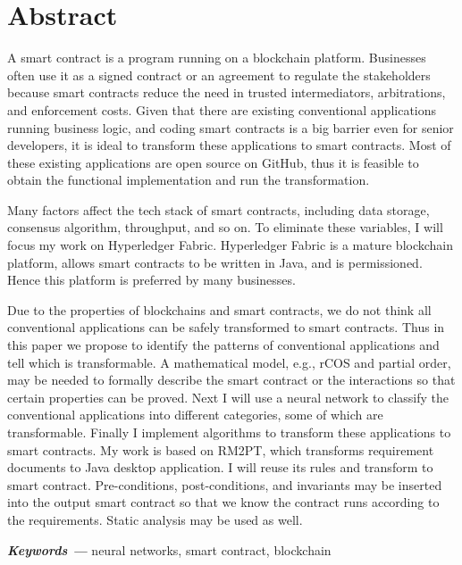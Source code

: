 \chapter{Abstract}

A smart contract is a program running on a blockchain platform.
Businesses often use it as a signed contract or an agreement to regulate the stakeholders
because smart contracts reduce the need in trusted intermediators, arbitrations, and enforcement costs.
Given that there are existing conventional applications running business logic,
and coding smart contracts is a big barrier even for senior developers,
it is ideal to transform these applications to smart contracts.
Most of these existing applications are open source on GitHub, thus it is feasible to obtain the functional implementation and run the transformation.

Many factors affect the tech stack of smart contracts, including data storage, consensus algorithm, throughput, and so on.
To eliminate these variables, I will focus my work on Hyperledger Fabric.
Hyperledger Fabric is a mature blockchain platform, allows smart contracts to be written in Java, and is permissioned.
Hence this platform is preferred by many businesses.

Due to the properties of blockchains and smart contracts, we do not think all conventional applications can be safely transformed to smart contracts.
Thus in this paper we propose to identify the patterns of conventional applications and tell which is transformable.
A mathematical model, e.g., rCOS and partial order, may be needed to formally describe the smart contract or the interactions so that certain properties can be proved.
Next I will use a neural network to classify the conventional applications into different categories, some of which are transformable.
Finally I implement algorithms to transform these applications to smart contracts.
My work is based on RM2PT, which transforms requirement documents to Java desktop application. I will reuse its rules and transform to smart contract.
Pre-conditions, post-conditions, and invariants may be inserted into the output smart contract so that we know the contract runs according to the requirements.
Static analysis may be used as well.



\textbf{\textit{Keywords ---}} neural networks, smart contract, blockchain